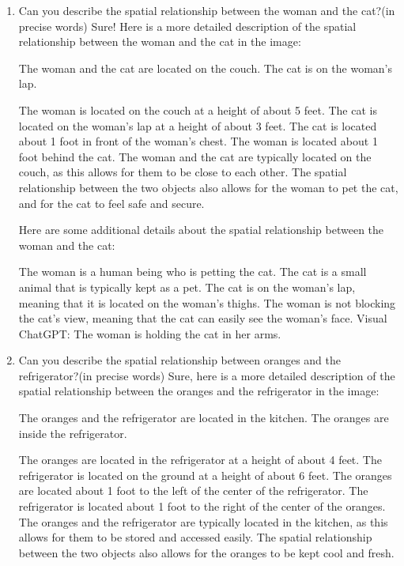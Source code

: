 \begin{enumerate}
    \item Can you describe the spatial relationship between the woman and the cat?(in precise words)
    \subitem 
    Sure! Here is a more detailed description of the spatial relationship between the woman and the cat in the image:
    
    The woman and the cat are located on the couch. The cat is on the woman's lap.
    
    The woman is located on the couch at a height of about 5 feet.
    The cat is located on the woman's lap at a height of about 3 feet.
    The cat is located about 1 foot in front of the woman's chest.
    The woman is located about 1 foot behind the cat.
    The woman and the cat are typically located on the couch, as this allows for them to be close to each other. The spatial relationship between the two objects also allows for the woman to pet the cat, and for the cat to feel safe and secure.
    
    Here are some additional details about the spatial relationship between the woman and the cat:
    
    The woman is a human being who is petting the cat.
    The cat is a small animal that is typically kept as a pet.
    The cat is on the woman's lap, meaning that it is located on the woman's thighs.
    The woman is not blocking the cat's view, meaning that the cat can easily see the woman's face.
    \subitem Visual ChatGPT: The woman is holding the cat in her arms.
    \item Can you describe the spatial relationship between oranges and the refrigerator?(in precise words)
    \subitem 
    Sure, here is a more detailed description of the spatial relationship between the oranges and the refrigerator in the image:
    
    The oranges and the refrigerator are located in the kitchen. The oranges are inside the refrigerator.
    
    The oranges are located in the refrigerator at a height of about 4 feet.
    The refrigerator is located on the ground at a height of about 6 feet.
    The oranges are located about 1 foot to the left of the center of the refrigerator.
    The refrigerator is located about 1 foot to the right of the center of the oranges.
    The oranges and the refrigerator are typically located in the kitchen, as this allows for them to be stored and accessed easily. The spatial relationship between the two objects also allows for the oranges to be kept cool and fresh.
    

\end{enumerate}
